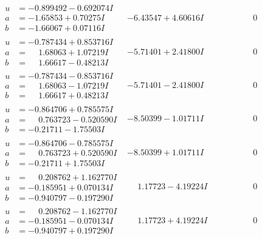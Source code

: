 \documentclass[1p]{elsarticle_modified}
\theoremstyle{definition}
\begin{document}
$$\begin{array}{c|c|c}
\begin{aligned}
u &= -0.899492 - 0.692074 I \\
a &= -1.65853 + 0.70275 I \\
b &= -1.66067 + 0.07116 I\end{aligned}
 & -6.43547 + 4.60616 I & \phantom{-0.000000 } 0 \\ \hline\begin{aligned}
u &= -0.787434 + 0.853716 I \\
a &= \phantom{-}1.68063 + 1.07219 I \\
b &= \phantom{-}1.66617 - 0.48213 I\end{aligned}
 & -5.71401 + 2.41800 I & \phantom{-0.000000 } 0 \\ \hline\begin{aligned}
u &= -0.787434 - 0.853716 I \\
a &= \phantom{-}1.68063 - 1.07219 I \\
b &= \phantom{-}1.66617 + 0.48213 I\end{aligned}
 & -5.71401 - 2.41800 I & \phantom{-0.000000 } 0 \\ \hline\begin{aligned}
u &= -0.864706 + 0.785575 I \\
a &= \phantom{-}0.763723 - 0.520590 I \\
b &= -0.21711 - 1.75503 I\end{aligned}
 & -8.50399 - 1.01711 I & \phantom{-0.000000 } 0 \\ \hline\begin{aligned}
u &= -0.864706 - 0.785575 I \\
a &= \phantom{-}0.763723 + 0.520590 I \\
b &= -0.21711 + 1.75503 I\end{aligned}
 & -8.50399 + 1.01711 I & \phantom{-0.000000 } 0 \\ \hline\begin{aligned}
u &= \phantom{-}0.208762 + 1.162770 I \\
a &= -0.185951 + 0.070134 I \\
b &= -0.940797 - 0.197290 I\end{aligned}
 & \phantom{-}1.17723 - 4.19224 I & \phantom{-0.000000 } 0 \\ \hline\begin{aligned}
u &= \phantom{-}0.208762 - 1.162770 I \\
a &= -0.185951 - 0.070134 I \\
b &= -0.940797 + 0.197290 I\end{aligned}
 & \phantom{-}1.17723 + 4.19224 I & \phantom{-0.000000 } 0\\

\end{array}$$
\end{document}
